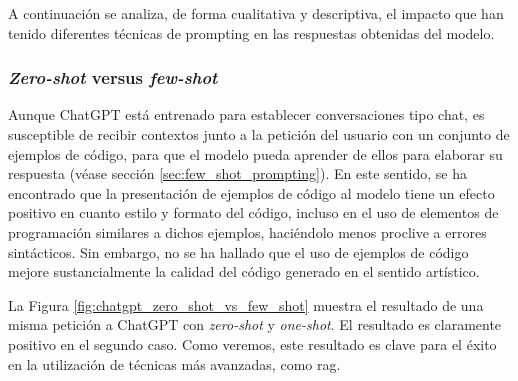 A continuación se analiza, de forma cualitativa y descriptiva, el impacto que han tenido diferentes técnicas de {prompting} en las respuestas obtenidas del modelo.

\subsubsection{\emph{Zero-shot} versus \emph{few-shot}}

Aunque ChatGPT está entrenado para establecer conversaciones tipo chat, es susceptible de recibir contextos junto a la petición del usuario con un conjunto de ejemplos de código, para que el modelo pueda aprender de ellos para elaborar su respuesta (véase sección \ref{sec:few_shot_prompting}). En este sentido, se ha encontrado que la presentación de ejemplos de código al modelo tiene un efecto positivo en cuanto estilo y formato del código, incluso en el uso de elementos de programación similares a dichos ejemplos, haciéndolo menos proclive a errores sintácticos. Sin embargo, no se ha hallado que el uso de ejemplos de código mejore sustancialmente la calidad del código generado en el sentido artístico. 

La Figura \ref{fig:chatgpt_zero_shot_vs_few_shot} muestra el resultado de una misma petición a ChatGPT con \emph{zero-shot} y \emph{one-shot}. El resultado es claramente positivo en el segundo caso. Como veremos, este resultado es clave para el éxito en la utilización de técnicas más avanzadas, como \gls{rag}.


